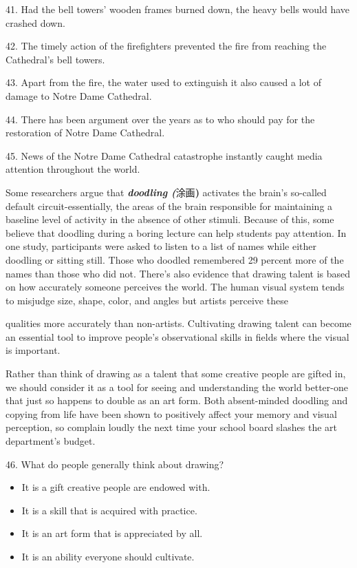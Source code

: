 \documentclass[UTF8,11pt]{ctexart}
\begin{document}
41. Had the bell towers' wooden frames burned down, the heavy bells would have crashed down.


42. The timely action of the firefighters prevented the fire from reaching the Cathedral's bell towers.


43. Apart from the fire, the water used to extinguish it also caused a lot of damage to Notre Dame Cathedral.


44. There has been argument over the years as to who should pay for the restoration of Notre Dame Cathedral.


45. News of the Notre Dame Cathedral catastrophe instantly caught media attention throughout the world.


Some researchers argue that \textbf{\textit{doodling (}}涂画\textbf{)}\textbf{\textit{ }}activates the brain's so-called default circuit-essentially, the areas of the brain responsible for maintaining a baseline level of activity in the absence of other stimuli. Because of this, some believe that doodling during a boring lecture can help students pay attention. In one study, participants were asked to listen to a list of names while either doodling or sitting still. Those who doodled remembered 29 percent more of the names than those who did not. There's also evidence that drawing talent is based on how accurately someone perceives the world. The human visual system tends to misjudge size, shape, color, and angles but artists perceive these


qualities more accurately than non-artists. Cultivating drawing talent can become an essential tool to improve people's observational skills in fields where the visual is important.


Rather than \textperiodcentered{}think of drawing as a talent that some creative people are gifted in, we should consider it as a tool for seeing and understanding the world better-one that just so happens to double as an art form. Both absent-minded doodling and copying from life have been shown to positively affect your memory and visual perception, so complain loudly the next time your school board slashes the art department's budget.


46. What do people generally think about drawing?


\begin{itemize}[leftmargin=2em,itemsep=.2em,topsep=.4em]\item[A.] It is a gift creative people are endowed with.
\item[B.] It is a skill that is acquired with practice.
\item[C.] It is an art form that is appreciated by all.
\item[D.] It is an ability everyone should cultivate.
\end{itemize}
\end{document}
